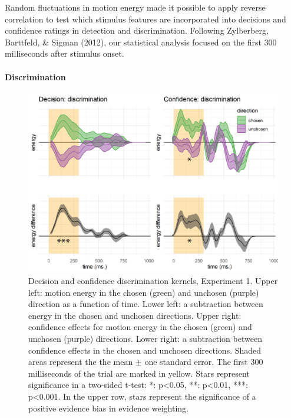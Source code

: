 \documentclass[12pt,twoside]{reedthesis}
\begin{document}
Random fluctuations in motion energy made it possible to apply reverse correlation to test which stimulus features are incorporated into decisions and confidence ratings in detection and discrimination. Following Zylberberg, Barttfeld, \& Sigman (2012), our statistical analysis focused on the first 300 milliseconds after stimulus onset.

\hypertarget{e1-disc-RC}{%
\paragraph*{Discrimination}\label{e1-disc-RC}}


\begin{figure}
\includegraphics[width=\textwidth]{figure/RC/RC-exp1-discrimination-RC-enhanced} \caption[Reverse correlation of discrimination trials, Exp. 1]{Decision and confidence discrimination kernels, Experiment 1. Upper left: motion energy in the chosen (green) and unchosen (purple) direction as a function of time. Lower left: a subtraction between energy in the chosen and unchosen directions. Upper right: confidence effects for motion energy in the chosen (green) and unchosen (purple) directions. Lower right: a subtraction between confidence effects in the chosen and unchosen directions. Shaded areas represent the the mean \(\pm\) one standard error. The first 300 milliseconds of the trial are marked in yellow. Stars represent significance in a two-sided t-test: *: p\textless0.05, **: p\textless0.01, ***: p\textless0.001. In the upper row, stars represent the significance of a positive evidence bias in evidence weighting.}\label{fig:RC-exp1-discrimination-RC}
\end{figure}
\end{document}
